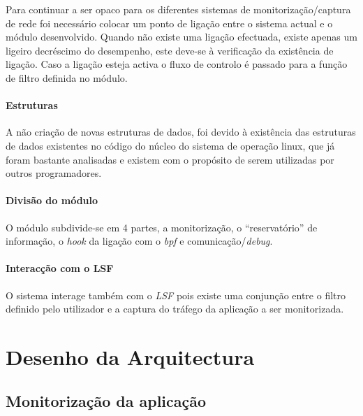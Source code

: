 Para continuar a ser opaco para os diferentes sistemas de monitorização/captura de rede foi necessário colocar um ponto de ligação entre o sistema actual e o módulo desenvolvido. Quando não existe uma ligação efectuada, existe apenas um ligeiro decréscimo do desempenho, este deve-se à verificação da existência de ligação. Caso a ligação esteja activa o fluxo de controlo é passado para a função de filtro definida no módulo.


\paragraph{Estruturas}

A não criação de novas estruturas de dados, foi devido à existência das
estruturas de dados existentes no código do núcleo do sistema de operação
linux, que já foram bastante analisadas e existem com o propósito de serem
utilizadas por outros programadores.

\paragraph{Divisão do módulo} 

O módulo subdivide-se em 4 partes, a monitorização, o ``reservatório'' de
informação, o \textit{hook} da ligação com o \textit{bpf} e
comunicação/\textit{debug}.

\paragraph{Interacção com o LSF}
O sistema interage também com o \textit{LSF} pois existe uma conjunção
entre o filtro definido pelo utilizador e a captura do tráfego da aplicação a
ser monitorizada.

\section{Desenho da Arquitectura}



\subsection{Monitorização da aplicação}

